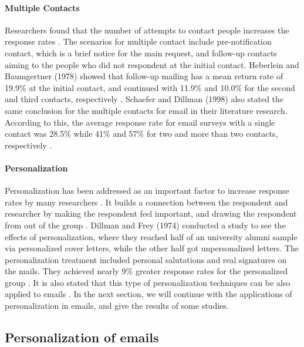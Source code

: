 \paragraph{Multiple Contacts}
Researchers found that the number of attempts to contact people increases the response rates \citep{Heberlein1978,Schaefer1998}. The scenarios for multiple contact include pre-notification contact, which is a brief notice for the main request, and follow-up contacts aiming to the people who did not respondent at the initial contact. Heberlein and Baumgertner (1978) showed that follow-up mailing has a mean return rate of 19.9\% at the initial contact, and continued with 11.9\% and 10.0\% for the second and third contacts, respectively \citep{Heberlein1978}. Schaefer and Dillman (1998) also stated the same conclusion for the multiple contacts for email in their literature research. According to this, the average response rate for email surveys with a single contact was 28.5\% while 41\% and 57\% for two and more than two contacts, respectively \citep{Schaefer1998}.

\paragraph{Personalization}
Personalization has been addressed as an important factor to increase response rates by many researchers \citep{Dillman1991,Schaefer1998}. It builds a connection between the respondent and researcher by making the respondent feel important, and drawing the respondent from out of the group \citep[page 272]{DillmanDonA.SmythJoleneD.Christian2009}. Dillman and Frey (1974) conducted a study to see the effects of personalization, where they reached half of an university alumni sample via personalized cover letters, while the other half got unpersonalized letters. The personalization treatment included personal salutations and real signatures on the mails. They achieved nearly 9\% greater response rates for the personalized group \citep{Dillman1974a}. It is also stated that this type of personalization techniques can be also applied to emails \citep{Schaefer1998}. In the next section, we will continue with the applications of personalization in emails, and give the results of some studies.

\subsection{Personalization of emails}
\label{sec:2.1.4:Pers}

